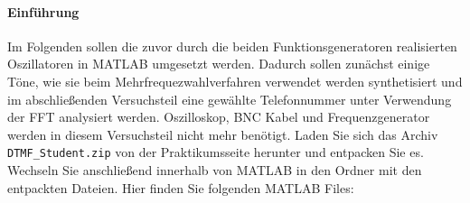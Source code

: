 \documentclass[10pt]{report}
\begin{document}
        \paragraph{Einführung}
        Im Folgenden sollen die zuvor durch die beiden Funktionsgeneratoren realisierten Oszillatoren
        in MATLAB umgesetzt werden. Dadurch sollen zunächst einige Töne, wie sie
        beim Mehrfrequezwahlverfahren verwendet werden synthetisiert und im abschließenden
        Versuchsteil eine \glqq{}gewählte\grqq{} Telefonnummer unter Verwendung der FFT analysiert werden.
        Oszilloskop, BNC Kabel und Frequenzgenerator werden in diesem Versuchsteil nicht
        mehr benötigt.
        Laden Sie sich das Archiv \texttt{DTMF\_Student.zip} von der Praktikumsseite herunter und
        entpacken Sie es. Wechseln Sie anschließend innerhalb von MATLAB in den Ordner mit
        den entpackten Dateien. Hier finden Sie folgenden MATLAB Files:
\end{document}
